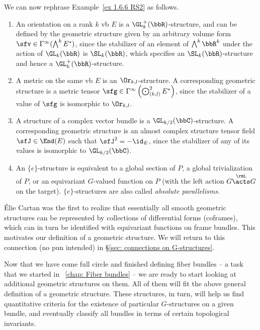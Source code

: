 \begin{example}
    We can now rephrase Example~\ref{ex 1.6.6 RS2} as follows. 
    \begin{enumerate}
        \item An orientation on a rank $k$ \gls{vb} $E$ is a $\GL_k^+(\bbR)$-structure, and can be defined by the geometric structure given by an arbitrary volume form $\sfv\in \Gamma^\infty(\bigwedge\nolimits^k E^\ast)$, since the stabilizer of an element of $\bigwedge\nolimits^k \bbR^k$ under the action of $\GL_k(\bbR)$ is $\SL_k(\bbR)$, which specifies an $\SL_k(\bbR)$-structure and hence a $\GL_k^+(\bbR)$-structure.
        \item A metric on the same \gls{vb} $E$ is an $\Or_{k,l}$-structure. A corresponding geometric structure is a metric tensor $\sfg\in \Gamma^\infty\left(\bigodot\nolimits^2_{(k,l)} E^\ast\right)$, since the stabilizer of a value of $\sfg$ is isomorphic to $\Or_{k,l}$. 
        \item A structure of a complex vector bundle is a $\GL_{k/2}(\bbC)$-structure. A corresponding geometric structure is an almost complex structure tensor field $\sfJ\in \End(E)$ such that $\sfJ^2=-\id_E$, since the stabilizer of any of its values is isomorphic to $\GL_{k/2}(\bbC)$.
        \item An $\{e\}$-structure is equivalent to a global section of $P$, a global trivialization of $P$, or an equivariant $G$-valued function on $P$ (with the left action $G\overset{\rmL}{\acts}G$ on the target). $\{e\}$-structures are also called \emph{absolute parallelisms}.
    \end{enumerate}
    \'Elie Cartan was the first to realize that essentially all smooth geometric structures can be represented by collections of differential forms (coframes), which can in turn be identified with equivariant functions on frame bundles. This motivates our definition of a geometric structure. We will return to this connection (no pun intended) in \S\ref{sec: connections on G-structures}.
\end{example}

Now that we have come full circle and finished defining fiber bundles -- a task that we started in \Chap~\ref{chap: Fiber bundles} -- we are ready to start looking at additional geometric structures on them. All of them will fit the above general definition of a geometric structure. These structures, in turn, will help us find quantitative criteria for the existence of particular $G$-structures on a given bundle, and eventually classify all bundles in terms of certain topological invariants.